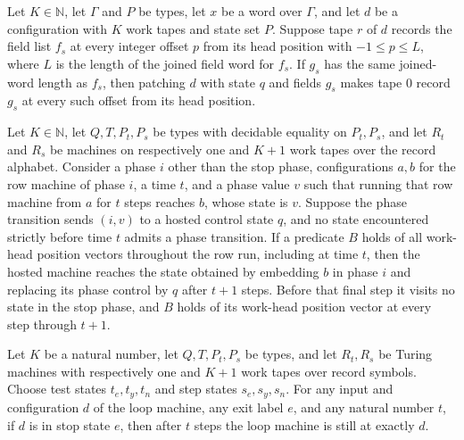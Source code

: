 \begin{theorem}
\label{Turing.wl_patch_record}
\leanok
{}
Let $K\in\mathbb{N}$, let $\Gamma$ and $P$ be types, let $x$ be a word over $\Gamma$,
and let $d$ be a configuration with $K$ work tapes and state set $P$. Suppose tape $r$
of $d$ records the field list $f_s$ at every integer offset $p$ from its head position
with $-1\le p\le L$, where $L$ is the length of the joined field word for $f_s$. If
$g_s$ has the same joined-word length as $f_s$, then patching $d$ with state $q$ and
fields $g_s$ makes tape $0$ record $g_s$ at every such offset from its head position.
\end{theorem}

\begin{theorem}
\label{Turing.wl_phase_segment}
\leanok
{}
Let $K\in\mathbb{N}$, let $Q,T,P_t,P_s$ be types with decidable equality on $P_t,P_s$,
and let $R_t$ and $R_s$ be machines on respectively one and $K+1$ work tapes over the
record alphabet. Consider a phase $i$ other than the stop phase, configurations $a,b$
for the row machine of phase $i$, a time $t$, and a phase value $v$ such that running
that row machine from $a$ for $t$ steps reaches $b$, whose state is $v$. Suppose the
phase transition sends $(i,v)$ to a hosted control state $q$, and no state encountered
strictly before time $t$ admits a phase transition. If a predicate $B$ holds of all
work-head position vectors throughout the row run, including at time $t$, then the
hosted machine reaches the state obtained by embedding $b$ in phase $i$ and replacing
its phase control by $q$ after $t+1$ steps. Before that final step it visits no state in
the stop phase, and $B$ holds of its work-head position vector at every step through
$t+1$.
\end{theorem}

\begin{theorem}
\label{Turing.wl_stop_fixed}
\leanok
{}
Let $K$ be a natural number, let $Q,T,P_t,P_s$ be types, and let $R_t,R_s$ be Turing
machines with respectively one and $K+1$ work tapes over record symbols. Choose test
states $t_e,t_y,t_n$ and step states $s_e,s_y,s_n$. For any input and configuration $d$
of the loop machine, any exit label $e$, and any natural number $t$, if $d$ is in stop
state $e$, then after $t$ steps the loop machine is still at exactly $d$.
\end{theorem}

